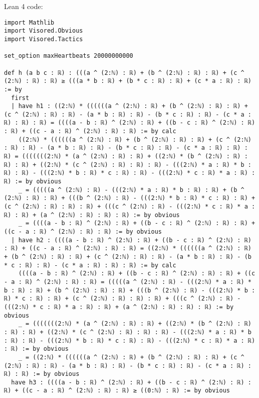 \documentclass{article}
\begin{document}
Lean 4 code:
\begin{tcolorbox}[colback=white!10, width=\linewidth]
\begin{lstlisting}[language=Lean4]
import Mathlib
import Visored.Obvious
import Visored.Tactics

set_option maxHeartbeats 20000000000

def h (a b c : ℝ) : (((a ^ (2:ℕ) : ℝ) + (b ^ (2:ℕ) : ℝ) : ℝ) + (c ^ (2:ℕ) : ℝ) : ℝ) ≥ (((a * b : ℝ) + (b * c : ℝ) : ℝ) + (c * a : ℝ) : ℝ) := by
  first
  | have h1 : ((2:ℕ) * ((((((a ^ (2:ℕ) : ℝ) + (b ^ (2:ℕ) : ℝ) : ℝ) + (c ^ (2:ℕ) : ℝ) : ℝ) - (a * b : ℝ) : ℝ) - (b * c : ℝ) : ℝ) - (c * a : ℝ) : ℝ) : ℝ) = ((((a - b : ℝ) ^ (2:ℕ) : ℝ) + ((b - c : ℝ) ^ (2:ℕ) : ℝ) : ℝ) + ((c - a : ℝ) ^ (2:ℕ) : ℝ) : ℝ) := by calc
    ((2:ℕ) * ((((((a ^ (2:ℕ) : ℝ) + (b ^ (2:ℕ) : ℝ) : ℝ) + (c ^ (2:ℕ) : ℝ) : ℝ) - (a * b : ℝ) : ℝ) - (b * c : ℝ) : ℝ) - (c * a : ℝ) : ℝ) : ℝ) = (((((((2:ℕ) * (a ^ (2:ℕ) : ℝ) : ℝ) + ((2:ℕ) * (b ^ (2:ℕ) : ℝ) : ℝ) : ℝ) + ((2:ℕ) * (c ^ (2:ℕ) : ℝ) : ℝ) : ℝ) - (((2:ℕ) * a : ℝ) * b : ℝ) : ℝ) - (((2:ℕ) * b : ℝ) * c : ℝ) : ℝ) - (((2:ℕ) * c : ℝ) * a : ℝ) : ℝ) := by obvious
    _ = (((((a ^ (2:ℕ) : ℝ) - (((2:ℕ) * a : ℝ) * b : ℝ) : ℝ) + (b ^ (2:ℕ) : ℝ) : ℝ) + (((b ^ (2:ℕ) : ℝ) - (((2:ℕ) * b : ℝ) * c : ℝ) : ℝ) + (c ^ (2:ℕ) : ℝ) : ℝ) : ℝ) + (((c ^ (2:ℕ) : ℝ) - (((2:ℕ) * c : ℝ) * a : ℝ) : ℝ) + (a ^ (2:ℕ) : ℝ) : ℝ) : ℝ) := by obvious
    _ = ((((a - b : ℝ) ^ (2:ℕ) : ℝ) + ((b - c : ℝ) ^ (2:ℕ) : ℝ) : ℝ) + ((c - a : ℝ) ^ (2:ℕ) : ℝ) : ℝ) := by obvious
  | have h2 : ((((a - b : ℝ) ^ (2:ℕ) : ℝ) + ((b - c : ℝ) ^ (2:ℕ) : ℝ) : ℝ) + ((c - a : ℝ) ^ (2:ℕ) : ℝ) : ℝ) = ((2:ℕ) * ((((((a ^ (2:ℕ) : ℝ) + (b ^ (2:ℕ) : ℝ) : ℝ) + (c ^ (2:ℕ) : ℝ) : ℝ) - (a * b : ℝ) : ℝ) - (b * c : ℝ) : ℝ) - (c * a : ℝ) : ℝ) : ℝ) := by calc
    ((((a - b : ℝ) ^ (2:ℕ) : ℝ) + ((b - c : ℝ) ^ (2:ℕ) : ℝ) : ℝ) + ((c - a : ℝ) ^ (2:ℕ) : ℝ) : ℝ) = (((((a ^ (2:ℕ) : ℝ) - (((2:ℕ) * a : ℝ) * b : ℝ) : ℝ) + (b ^ (2:ℕ) : ℝ) : ℝ) + (((b ^ (2:ℕ) : ℝ) - (((2:ℕ) * b : ℝ) * c : ℝ) : ℝ) + (c ^ (2:ℕ) : ℝ) : ℝ) : ℝ) + (((c ^ (2:ℕ) : ℝ) - (((2:ℕ) * c : ℝ) * a : ℝ) : ℝ) + (a ^ (2:ℕ) : ℝ) : ℝ) : ℝ) := by obvious
    _ = (((((((2:ℕ) * (a ^ (2:ℕ) : ℝ) : ℝ) + ((2:ℕ) * (b ^ (2:ℕ) : ℝ) : ℝ) : ℝ) + ((2:ℕ) * (c ^ (2:ℕ) : ℝ) : ℝ) : ℝ) - (((2:ℕ) * a : ℝ) * b : ℝ) : ℝ) - (((2:ℕ) * b : ℝ) * c : ℝ) : ℝ) - (((2:ℕ) * c : ℝ) * a : ℝ) : ℝ) := by obvious
    _ = ((2:ℕ) * ((((((a ^ (2:ℕ) : ℝ) + (b ^ (2:ℕ) : ℝ) : ℝ) + (c ^ (2:ℕ) : ℝ) : ℝ) - (a * b : ℝ) : ℝ) - (b * c : ℝ) : ℝ) - (c * a : ℝ) : ℝ) : ℝ) := by obvious
  have h3 : ((((a - b : ℝ) ^ (2:ℕ) : ℝ) + ((b - c : ℝ) ^ (2:ℕ) : ℝ) : ℝ) + ((c - a : ℝ) ^ (2:ℕ) : ℝ) : ℝ) ≥ ((0:ℕ) : ℝ) := by obvious

\end{lstlisting}
\end{tcolorbox}
\end{document}
